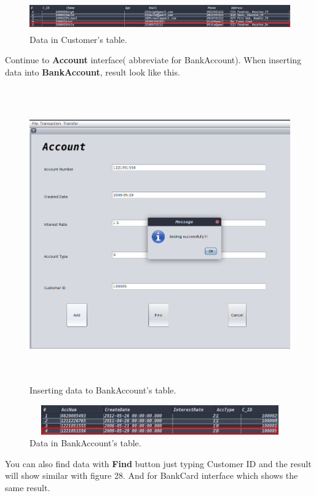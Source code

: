 \documentclass[12pt,a4paper]{article}
\begin{document}
\begin{figure}[H]
        \centering
        \includegraphics[width=5.5in,height=0.5in]{Picture/resultInserting.png}
        \caption{Data in Customer's table.}
    \end{figure}
\newpage
\indent Continue to \textbf{Account} interface(
abbreviate for BankAccount). When inserting data into \textbf{BankAccount}, result look like this.
\begin{figure}[H]
        \centering
        \includegraphics[width=5.5in,height=5in]{Picture/insertAcc.png}
        \caption{Inserting data to BankAccount's table.}
    \end{figure}

\begin{figure}[H]
        \centering
        \includegraphics[width=5.5in,height=0.5in]{Picture/resultInserting1.png}
        \caption{Data in BankAccount's table.}
    \end{figure}
\indent You can also find data with \textbf{Find} button just typing Customer ID and the result will show similar with figure 28. 
\newpage
\indent And for BankCard interface which shows the same result.
\end{document}
